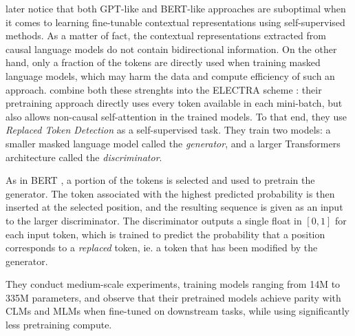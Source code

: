 \citet{electra} later notice that both GPT-like and BERT-like approaches are suboptimal when it comes to learning fine-tunable contextual representations using self-supervised methods. As a matter of fact, the contextual representations extracted from causal language models do not contain bidirectional information. On the other hand, only a fraction of the tokens are directly used when training masked language models, which may harm the data and compute efficiency of such an approach. \citet{electra} combine both these strenghts into the ELECTRA scheme : their pretraining approach directly uses every token available in each mini-batch, but also allows non-causal self-attention in the trained models. To that end, they use \textit{Replaced Token Detection} as a self-supervised task. They train two models: a smaller masked language model called the \textit{generator}, and a larger Transformers architecture called the \textit{discriminator}.

As in BERT \citep{devlin-etal-2019-bert}, a portion of the tokens is selected and used to pretrain the generator. The token associated with the highest predicted probability is then inserted at the selected position, and the resulting sequence is given as an input to the larger discriminator. The discriminator outputs a single float in $[0, 1]$ for each input token, which is trained to predict the probability that a position corresponds to a \textit{replaced} token, ie. a token that has been modified by the generator.

They conduct medium-scale experiments, training models ranging from 14M to 335M parameters, and observe that their pretrained models achieve parity with CLMs and MLMs when fine-tuned on downstream tasks, while using significantly less pretraining compute.

